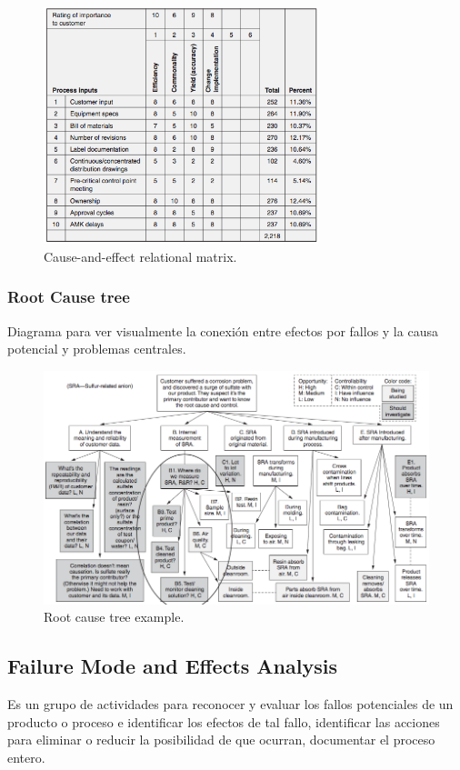 \documentclass[]{article}
\begin{document}
\begin{figure}[H]
	\centering
	\includegraphics[width=80mm]{imagenes/Cause-and-effectrelationalmatrix.png}
	\caption{Cause-and-effect relational matrix.}
	\label{fig:Cause-and-effectrelationalmatrix}
\end{figure}


\subsubsection{Root Cause tree}
Diagrama para ver visualmente la conexión entre efectos por fallos y la causa potencial y problemas centrales.

\begin{figure}[H]
	\centering
	\includegraphics[width=140mm]{imagenes/Rootcausetreeexample.png}
	\caption{Root cause tree example.}
	\label{fig:Rootcausetreeexample}
\end{figure}

\subsection{Failure Mode and Effects Analysis}
Es un grupo de actividades para reconocer y evaluar los fallos potenciales de un producto o proceso e identificar los efectos de tal fallo, identificar las acciones para eliminar o reducir la posibilidad de que ocurran, documentar el proceso entero.
\end{document}
